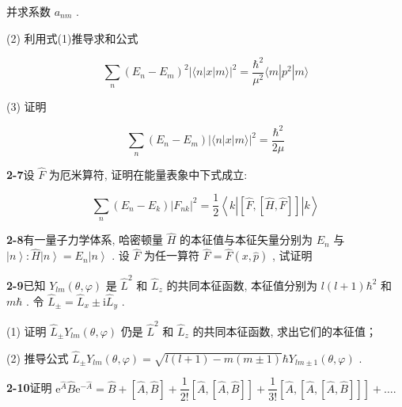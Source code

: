 并求系数 $\displaystyle a_{nm}$ .

(2) 利用式(1)推导求和公式

\begin{equation}\tag{2}
\sum_{n} (E_{n} - E_{m})^{2} \left|\langle n | x | m \rangle\right|^{2} = \dfrac{\hbar^{2}}{\mu^{2}} \langle m | p^{2} | m \rangle
\end{equation}

(3) 证明

\begin{equation}\tag{3}
\sum_{n} (E_{n} - E_{m}) \left|\langle n | x | m \rangle\right|^{2} = \dfrac{\hbar^{2}}{2\mu}
\end{equation}

\vfill

\newpage

\textbf{2-7}\quad 设 $\displaystyle \hat{F}$ 为厄米算符, 证明在能量表象中下式成立:

$$
\sum_ {n} (E _ {n} - E _ {k}) \left| F _ {n k} \right| ^ {2} = \dfrac {1}{2} \left\langle k \left| [ \hat {F}, [ \hat {H}, \hat {F} ] ] \right| k \right\rangle
$$

\vfill

\newpage

\textbf{2-8}\quad 有一量子力学体系, 哈密顿量 $\displaystyle \hat{H}$ 的本征值与本征矢量分别为 $\displaystyle E_{n}$ 与 $\displaystyle \left|n\right\rangle: \hat{H}\left|n\right\rangle = E_{n}\left|n\right\rangle$ . 设 $\displaystyle \hat{F}$ 为任一算符 $\displaystyle \hat{F} = \hat{F}(x, \hat{p})$ , 试证明

\vfill

\newpage

\textbf{2-9}\quad 已知 $\displaystyle Y_{lm}(\theta, \varphi)$ 是 $\displaystyle \hat{L}^2$ 和 $\displaystyle \hat{L}_z$ 的共同本征函数, 本征值分别为 $\displaystyle l(l + 1)\hbar^2$ 和 $\displaystyle m\hbar$ . 令 $\displaystyle \hat{L}_{\pm} = \hat{L}_x \pm \mathrm{i}\hat{L}_y$ .

(1) 证明 $\displaystyle \hat{L}_{\pm}Y_{lm}(\theta, \varphi)$ 仍是 $\displaystyle \hat{L}^2$ 和 $\displaystyle \hat{L}_z$ 的共同本征函数, 求出它们的本征值；

(2) 推导公式 $\displaystyle \hat{L}_{\pm}Y_{lm}(\theta, \varphi) = \sqrt{l(l + 1) - m(m \pm 1)}\hbar Y_{lm \pm 1}(\theta, \varphi)$ .

\vfill

\newpage

\textbf{2-10}\quad 证明 $\displaystyle \mathrm{e}^{\hat{A}}\hat{B}\mathrm{e}^{-\hat{A}} = \hat{B} + [\hat{A},\hat{B}] + \dfrac{1}{2!} [\hat{A},[\hat{A},\hat{B}]] + \dfrac{1}{3!} [\hat{A},[\hat{A},[\hat{A},\hat{B}]]] + \dots .$

